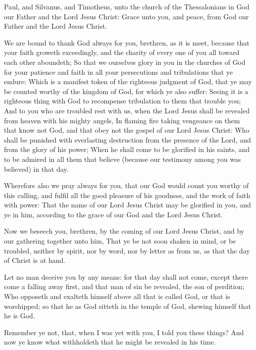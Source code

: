 \Chapter
\Verse Paul, and Silvanus, and Timotheus, unto the church of the Thessalonians in God our Father and the Lord Jesus Christ: \Verse Grace unto you, and peace, from God our Father and the Lord Jesus Christ.

\Verse We are bound to thank God always for you, brethren, as it is meet, because that your faith groweth exceedingly, and the charity of every one of you all toward each other aboundeth; \Verse So that we ourselves glory in you in the churches of God for your patience and faith in all your persecutions and tribulations that ye endure: \Verse Which is a manifest token of the righteous judgment of God, that ye may be counted worthy of the kingdom of God, for which ye also suffer: \Verse Seeing it is a righteous thing with God to recompense tribulation to them that trouble you; \Verse And to you who are troubled rest with us, when the Lord Jesus shall be revealed from heaven with his mighty angels, \Verse In flaming fire taking vengeance on them that know not God, and that obey not the gospel of our Lord Jesus Christ: \Verse Who shall be punished with everlasting destruction from the presence of the Lord, and from the glory of his power; \Verse When he shall come to be glorified in his saints, and to be admired in all them that believe (because our testimony among you was believed) in that day.

\Verse Wherefore also we pray always for you, that our God would count you worthy of this calling, and fulfil all the good pleasure of his goodness, and the work of faith with power: \Verse That the name of our Lord Jesus Christ may be glorified in you, and ye in him, according to the grace of our God and the Lord Jesus Christ.


\Chapter
\Verse Now we beseech you, brethren, by the coming of our Lord Jesus Christ, and by our gathering together unto him, \Verse That ye be not soon shaken in mind, or be troubled, neither by spirit, nor by word, nor by letter as from us, as that the day of Christ is at hand.

\Verse Let no man deceive you by any means: for that day shall not come, except there come a falling away first, and that man of sin be revealed, the son of perdition; \Verse Who opposeth and exalteth himself above all that is called God, or that is worshipped; so that he as God sitteth in the temple of God, shewing himself that he is God.

\Verse Remember ye not, that, when I was yet with you, I told you these things?  \Verse And now ye know what withholdeth that he might be revealed in his time.

